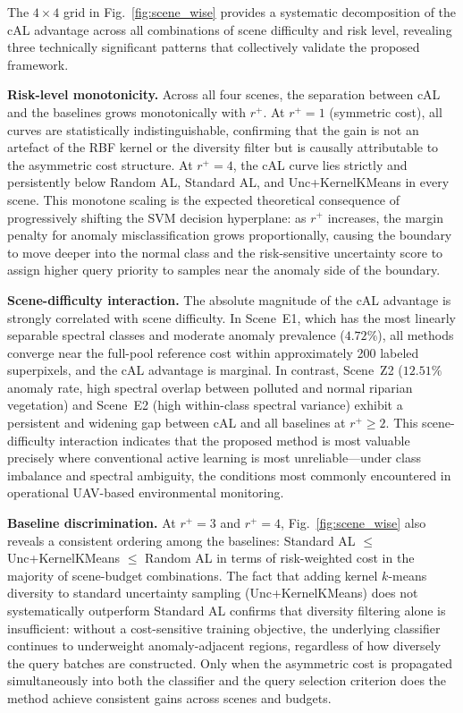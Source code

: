 \documentclass[lettersize,journal]{IEEEtran}
\begin{document}
The $4 \times 4$ grid in Fig.~\ref{fig:scene_wise} provides a
systematic decomposition of the cAL advantage across all combinations
of scene difficulty and risk level, revealing three technically
significant patterns that collectively validate the proposed framework.

\textbf{Risk-level monotonicity.} Across all four scenes, the
separation between cAL and the baselines grows monotonically with
$r^{+}$. At $r^{+}=1$ (symmetric cost), all curves are
statistically indistinguishable, confirming that the gain is not
an artefact of the RBF kernel or the diversity filter but is
causally attributable to the asymmetric cost structure. At
$r^{+}=4$, the cAL curve lies strictly and persistently below
Random AL, Standard AL, and Unc+KernelKMeans in every scene.
This monotone scaling is the expected theoretical consequence of
progressively shifting the SVM decision hyperplane: as $r^{+}$
increases, the margin penalty for anomaly misclassification grows
proportionally, causing the boundary to move deeper into the normal
class and the risk-sensitive uncertainty score to assign higher
query priority to samples near the anomaly side of the boundary.

\textbf{Scene-difficulty interaction.} The absolute magnitude of
the cAL advantage is strongly correlated with scene difficulty.
In Scene~E1, which has the most linearly separable spectral classes
and moderate anomaly prevalence ($4.72\%$), all methods converge
near the full-pool reference cost within approximately 200 labeled
superpixels, and the cAL advantage is marginal. In contrast,
Scene~Z2 ($12.51\%$ anomaly rate, high spectral overlap between
polluted and normal riparian vegetation) and Scene~E2 (high
within-class spectral variance) exhibit a persistent and widening
gap between cAL and all baselines at $r^{+} \geq 2$. This
scene-difficulty interaction indicates that the proposed method
is most valuable precisely where conventional active learning
is most unreliable---under class imbalance and spectral
ambiguity, the conditions most commonly encountered in
operational UAV-based environmental monitoring.

\textbf{Baseline discrimination.} At $r^{+}=3$ and $r^{+}=4$,
Fig.~\ref{fig:scene_wise} also reveals a consistent ordering
among the baselines: Standard AL $\leq$ Unc+KernelKMeans
$\leq$ Random AL in terms of risk-weighted cost in the majority
of scene-budget combinations. The fact that adding kernel
$k$-means diversity to standard uncertainty sampling
(Unc+KernelKMeans) does not systematically outperform Standard
AL confirms that diversity filtering alone is insufficient:
without a cost-sensitive training objective, the underlying
classifier continues to underweight anomaly-adjacent regions,
regardless of how diversely the query batches are constructed.
Only when the asymmetric cost is propagated simultaneously into
both the classifier and the query selection criterion does the
method achieve consistent gains across scenes and budgets.
\end{document}
